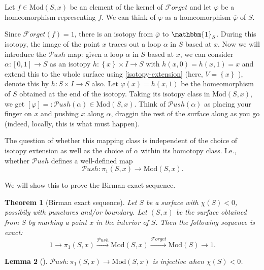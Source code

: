 \documentclass[reqno]{amsart}
\newtheorem{theorem}{Theorem}[section]
\newtheorem{lemma}[theorem]{Lemma}
\theoremstyle{definition}
\theoremstyle{remark}
\newcommand{\Mod}{{\mathrm{Mod}}}
\newcommand{\Push}{{\mathcal{P}}ush}
\newcommand{\Forget}{{\mathcal{F}}orget}
\begin{document}
 Let $f \in \Mod(S,x)$ be an element of the kernel
 of $\Forget$ and let  $\varphi $ be a homeomorphism
 representing $f$. We can think of
 $\varphi $ as a homeomorphism $\overline{\varphi}$ of
 $S$.

 Since $\Forget (f) = 1$, there is an isotopy
 from $\overline{\varphi }$ to $\mathbbm{1}_S$. During
 this isotopy, the image of the point $x$ traces out a
 loop $\alpha$ in $S$ based at $x$. Now
 we will introduce the $\Push$ map:
 given a loop $\alpha$ in $S$ based at $x$, we can
 consider $\alpha \colon \left[ 0,1 \right] \to S$ as
 an isotopy $h \colon \left\{ x \right\} \times I
 \to S$ with $h(x,0) = h(x,1) = x$ and extend this
 to the whole surface using \ref{isotopy-extension} (here,
 $V = \left\{ x \right\} $ ), denote this by
 $h \colon S \times I \to S$ also. Let
 $\varphi (x) = h(x,1) $ be the homeomorphism
 of $S$ obtained at the end of the isotopy. Taking its
 isotopy class in $\Mod \left( S,x \right) $, we get
 $\left[ \varphi  \right] = : 
 \Push(\alpha) \in \Mod\left( S,x \right) $.
 Think of $\Push(\alpha)$ as placing your finger on
 $x$ and pushing $x$ along $\alpha$, draggin the
 rest of the surface along as you go (indeed, locally,
 this is what must happen).

 The question of whether this mapping class
 is independent of the choice of isotopy extension
 as well as the choice of $\alpha$ within its homotopy class.
 I.e., whether $\Push$ defines a 
 well-defined map
 \[
 \Push \colon \pi_1 \left( S,x \right) 
 \to \Mod \left( S,x \right) .
 \] 

 We will show this to prove the Birman exact sequence.





 \begin{theorem}[Birman exact sequence]
     Let $S$ be a surface with $\chi (S) < 0$, possibily
     with punctures and/or boundary. Let
     $\left( S, x \right) $ be the surface
     obtained from $S$ by marking a point $x$ in
     the interior of $S$. Then the following
     sequence is exact:
     \[
         1 \to \pi_1 \left( S, x \right) \stackrel{\Push}{\to }
         \Mod \left( S, x \right) 
         \stackrel{\Forget}{\to } \Mod(S) \to 1.
     \] 
 \end{theorem}


 \begin{lemma}[]
     $\Push \colon \pi_1 \left( S,x \right) 
     \to \Mod (S,x)$ is injective when
     $\chi (S) <0$.
 \end{lemma}
\end{document}
